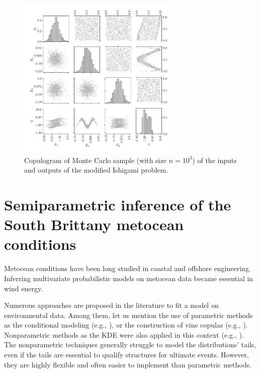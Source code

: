 \begin{figure}
    \centering
    \includegraphics[width=0.7\textwidth]{../numerical_experiments/chapter3/figures/ishigami_copluogram.png}
    \caption{Copulogram of Monte Carlo sample (with size $n=10^3$) of the inputs and outputs of the modified Ishigami problem.}
    \label{fig:ishigami_copulogram}
\end{figure}



\newpage
\section{Semiparametric inference of the South Brittany metocean conditions} \label{sec:32_inference}
Metocean conditions have been long studied in coastal and offshore engineering. 
Inferring multivariate probabilistic models on metocean data became essential in wind energy. 

Numerous approaches are proposed in the literature to fit a model on environmental data. 
Among them, let us mention the use of parametric methods as the conditional modeling (e.g., \citealp{bitner_2015_joint,vanem_fekhari_2023}), or the construction of vine copulas (e.g., \citealp{vanem_2016,montes_2016_cvines_metocean,lin_2019_cvines_waves}). 
Nonparametric methods as the KDE were also applied in this context (e.g., \citealp{han_2018_kde_metocean}). 
The nonparametric techniques generally struggle to model the distributions' tails, even if the tails are essential to qualify structures for ultimate events. 
However, they are highly flexible and often easier to implement than parametric methods.

